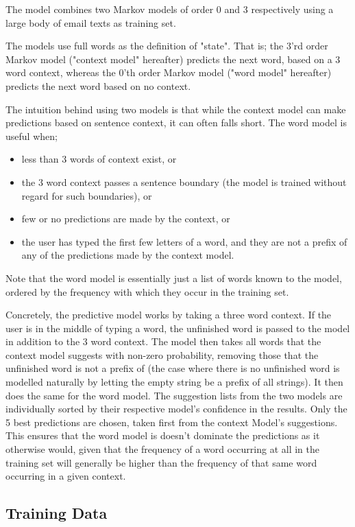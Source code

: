 \documentclass[a4paper, titlepage]{article}
\renewcommand{\%}{\scalebox{.9}{\oldpct}}
\begin{document}
The model combines two Markov models of order 0 and 3 respectively
using a large body of email texts as training set.

The models use full words as the definition of "state". That is; the 3'rd order
Markov model ("context model" hereafter) predicts the next word, based on a 3 word context, whereas the
0'th order Markov model ("word model" hereafter) predicts the next word based on no context.

The intuition behind using two models is that while the context model
can make predictions based on sentence context, it can often falls short.
The word model is useful when;
\begin{itemize}
	\item less than 3 words of context exist, or
	\item the 3 word context passes a sentence boundary (the model is
		trained without regard for such boundaries), or
	\item few or no predictions are made by the context, or
	\item the user has typed the first few letters of a word, and they are
		not a prefix of any of the predictions made by the context model.
\end{itemize}

Note that the word model is essentially just a list of words known
to the model, ordered by the frequency with which they occur in the training
set.

Concretely, the predictive model works by taking a three word context.
If the user is in the middle of typing a word, the unfinished word is passed to
the model in addition to the 3 word context.
The model then takes all words that the context model suggests with
non-zero probability, removing those that the unfinished word is not a prefix of
(the case where there is no unfinished word is modelled naturally by letting the
empty string be a prefix of all strings). It then does the same for the word
model. The suggestion lists from the two models are individually sorted by their
respective model's confidence in the results. Only the 5 best predictions are
chosen, taken first from the context Model's suggestions. This ensures that the
word model is doesn't dominate the predictions as it otherwise would, given that
the frequency of a word occurring at all in the training set will generally be
higher than the frequency of that same word occurring in a given context.

\subsection{Training Data}
\end{document}

